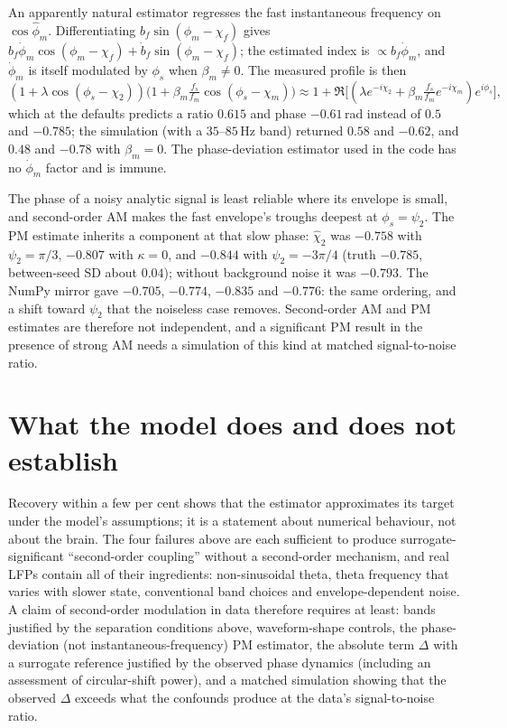 \begin{caution}
An apparently natural estimator regresses the fast instantaneous frequency
on $\cos\hat\phi_m$. Differentiating $b_f\sin(\phi_m-\chi_f)$ gives
$b_f\dot\phi_m\cos(\phi_m-\chi_f)+\dot b_f\sin(\phi_m-\chi_f)$; the
estimated index is $\propto b_f\dot\phi_m$, and $\dot\phi_m$ is itself
modulated by $\phi_s$ when $\beta_m\ne0$. The measured profile is then
\[
(1+\lambda\cos(\phi_s-\chi_2))
\bigl(1+\beta_m\tfrac{f_s}{f_m}\cos(\phi_s-\chi_m)\bigr)
\approx1+\Re\bigl[(\lambda e^{-i\chi_2}+\beta_m\tfrac{f_s}{f_m}e^{-i\chi_m})
e^{i\phi_s}\bigr],
\]
which at the defaults predicts a ratio $0.615$ and phase $-0.61$\,rad
instead of $0.5$ and $-0.785$; the simulation (with a $35$--$85$\,Hz band)
returned $0.58$ and $-0.62$, and $0.48$ and $-0.78$ with $\beta_m=0$.
The phase-deviation estimator
used in the code has no $\dot\phi_m$ factor and is immune.
\end{caution}

\begin{caution}
The phase of a noisy analytic signal is least reliable where its envelope
is small, and second-order AM makes the fast envelope's troughs deepest at
$\phi_s=\psi_2$. The PM estimate inherits a component at that slow phase:
$\hat\chi_2$ was $-0.758$ with $\psi_2=\pi/3$, $-0.807$ with $\kappa=0$,
and $-0.844$ with $\psi_2=-3\pi/4$ (truth $-0.785$, between-seed SD about
$0.04$); without background noise it was $-0.793$. The NumPy mirror gave
$-0.705$, $-0.774$, $-0.835$ and $-0.776$: the same ordering, and a shift
toward $\psi_2$ that the noiseless case removes. Second-order AM and PM estimates are therefore not
independent, and a significant PM result in the presence of strong AM
needs a simulation of this kind at matched signal-to-noise ratio.
\end{caution}

\section{What the model does and does not establish}
Recovery within a few per cent shows that the estimator approximates its
target under the model's assumptions; it is a statement about numerical
behaviour, not about the brain. The four failures above are each
sufficient to produce surrogate-significant ``second-order coupling''
without a second-order mechanism, and real LFPs contain all of their
ingredients: non-sinusoidal theta, theta frequency that varies with slower
state, conventional band choices and envelope-dependent noise. A claim of
second-order modulation in data therefore requires at least: bands
justified by the separation conditions above, waveform-shape controls,
the phase-deviation (not instantaneous-frequency) PM estimator, the
absolute term $\Delta$ with a surrogate reference justified by the observed
phase dynamics (including an assessment of circular-shift power), and a matched
simulation showing that the observed $\Delta$ exceeds what the confounds
produce at the data's signal-to-noise ratio.


